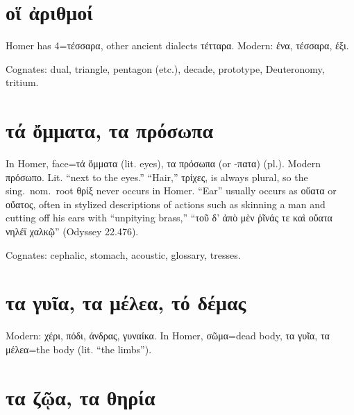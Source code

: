 \documentclass[12pt,openany]{book}
\newenvironment{notes}{\vfill\scriptsize\begin{flushright}}{\end{flushright}}
\newcommand{\fig}[1]{\begin{center}\end{center}}
\begin{document}

\chapter{οἵ ἀριθμοί}

\fig{numbers/numbers.svg}

\begin{notes}
Homer has 4=τέσσαρα, other ancient dialects τέτταρα.
Modern: ένα, τέσσαρα, έξι.

Cognates: dual, triangle, pentagon (etc.), decade,
prototype, Deuteronomy, tritium.
\end{notes}


\chapter{τά ὄμματα, τα πρόσωπα}

\fig{face/face.svg}

\begin{notes}
In Homer, face=τά ὄμματα (lit. eyes), τα πρόσωπα (or -πατα) (pl.).
Modern πρόσωπο. Lit. ``next to the eyes.''
``Hair,'' τρίχες, is always plural, so the sing.~nom.~root θρίξ never occurs in Homer.
``Ear'' usually occurs as οὔατα or οὔατος, often in stylized descriptions of actions such as
skinning a man and cutting off his ears with ``unpitying brass,'' ``τοῦ δ' ἀπὸ μὲν ῥῖνάς τε καὶ οὔατα νηλέϊ χαλκῷ'' (Odyssey 22.476).


Cognates: cephalic, stomach,
acoustic, glossary, tresses.
\end{notes}


\chapter{τα γυῖα, τα μέλεα, τό δέμας}

\fig{body/body.svg}

\begin{notes}
Modern: χέρι, πόδι, άνδρας, γυναίκα. In Homer, σῶμα=dead body, τα γυῖα, τα μέλεα=the body (lit. ``the limbs'').
\end{notes}


\chapter{τα ζῷα, τα θηρία}
\end{document}
